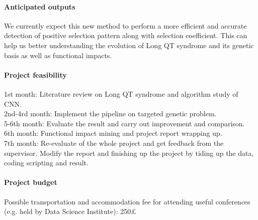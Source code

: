 \documentclass[11pt,a4paper]{article}
\begin{document}
\paragraph{Anticipated outputs}
We currently expect this new method to perform a more efficient and accurate detection of positive selection pattern along with selection coefficient. This can help us better understanding the evolution of Long QT syndrome and its genetic basis as well as functional impacts.

\paragraph{Project feasibility}
1st month: Literature review on Long QT syndrome and algorithm study of CNN.  
\\
2nd-4rd month: Implement the pipeline on targeted genetic problem.
\\
5-6th month: Evaluate the result and carry out improvement and comparison. 
\\
6th month: Functional impact mining and project report wrapping up.
\\
7th month: Re-evaluate of the whole project and get feedback from the supervisor. Modify the report and finishing up the project by tiding up the data, coding scripting and result.

\paragraph{Project budget}
Possible transportation and accommodation fee for attending useful conferences (e.g. held by Data Science Institute): 250£




\end{document}
